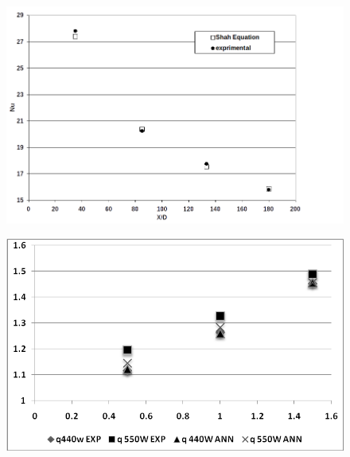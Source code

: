 \documentclass{article}
\begin{document}
\begin{figure}
	\centering
	\includegraphics[width=0.9\linewidth]{fig6}
	\caption{}
	\label{fig:fig6}
\end{figure}


\begin{figure}
	\centering
	\includegraphics[width=0.7\linewidth]{fig9}
	\caption{}
	\label{fig:fig9}
\end{figure}
\end{document}
